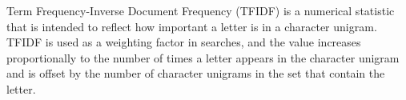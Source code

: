 \documentclass[conference]{IEEEtran}
\begin{document}
%
%
%
%
Term Frequency-Inverse Document Frequency (TFIDF) is a numerical statistic that is intended to reflect how important a letter is in a character unigram. TFIDF is used as a weighting factor in searches, and the value increases proportionally to the number of times a letter appears in the character unigram and is offset by the number of character unigrams in the set that contain the letter. 
\end{document}
